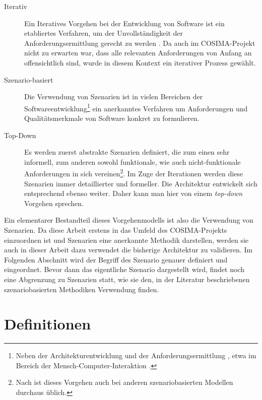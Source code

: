   \begin{description}
    \item[Iterativ] Ein Iteratives Vorgehen bei der Entwicklung von Software ist ein etabliertes Verfahren, um der Unvollständigkeit der Anforderungsermittlung gerecht zu werden \citep{brooks1987nsb,basili2005iea,boehm1986sm,kruchten2003rup}. Da auch im COSIMA-Projekt nicht zu erwarten war, dass alle relevanten Anforderungen von Anfang an offensichtlich sind, wurde in diesem Kontext ein iterativer Prozess gewählt.
    \item[Szenario-basiert] Die Verwendung von Szenarien ist in vielen Bereichen der Softwareentwicklung\footnote{Neben der Architekturentwicklung \citep{software_architecture_in_practice,scenario_based_software_architecture_evaluation_methods} und der Anforderungsermittlung \citep{weidenhaupt1998sus}, etwa im Bereich der Mensch-Computer-Interaktion \citep{five_reasons_for_scenario_based_design}.} ein anerkanntes Verfahren um Anforderungen und Qualitätsmerkmale von Software konkret zu formulieren.
    \item[Top-Down] Es werden zuerst abstrakte Szenarien definiert, die zum einen sehr informell, zum anderen sowohl funktionale, wie auch nicht-funktionale Anforderungen in sich vereinen\footnote{Nach  \citep[S. 42f]{weidenhaupt1998ssd} ist dieses Vorgehen auch bei anderen szenariobasierten Modellen durchaus üblich.}. Im Zuge der Iterationen werden diese Szenarien immer detaillierter und formeller. Die Architektur entwickelt sich entsprechend ebenso weiter. Daher kann man hier von einem \emph{top-down} Vorgehen sprechen.
  \end{description}
  
  Ein elementarer Bestandteil dieses Vorgehenmodells ist also die Verwendung von Szenarien. Da diese Arbeit erstens in das Umfeld des COSIMA-Projekts einzuordnen ist und Szenarien eine anerkannte Methodik darstellen, werden sie auch in dieser Arbeit dazu verwendet die bisherige Architektur zu validieren. Im Folgenden Abschnitt wird der Begriff des Szenario genauer definiert und eingeordnet. Bevor dann das eigentliche Szenario dargestellt wird, findet noch eine Abgrenzung zu Szenarien statt, wie sie den, in der Literatur beschriebenen szenariobasierten Methodiken Verwendung finden.
  
\section{Definitionen} %
\label{sec:definition_szenario}

